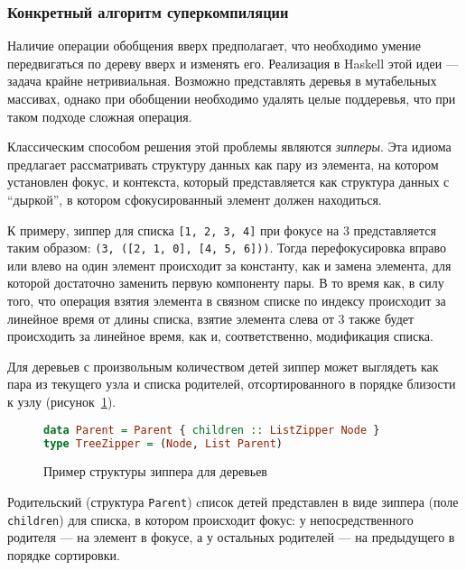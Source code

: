 \subsubsection{Конкретный алгоритм суперкомпиляции}

Наличие операции обобщения вверх предполагает, что необходимо умение передвигаться по дереву вверх и изменять его. 
Реализация в Haskell этой идеи --- задача крайне нетривиальная. Возможно представлять
деревья в мутабельных массивах, однако при обобщении необходимо удалять целые поддеревья,
что при таком подходе сложная операция.

Классическим способом решения этой проблемы являются \emph{зипперы}\cite{zipper}.
Эта идиома предлагает рассматривать структуру данных как пару из элемента,
на котором установлен фокус, и контекста, который представляется как структура данных
с ``дыркой'', в котором сфокусированный элемент должен находиться.

К примеру, зиппер для списка \lstinline{[1, 2, 3, 4]} при фокусе на 3 представляется
таким образом: \lstinline{(3, ([2, 1, 0], [4, 5, 6]))}.
Тогда перефокусировка вправо или влево на один элемент происходит за константу,
как и замена элемента, для которой достаточно заменить первую компоненту пары.
В то время как, в силу того, что операция взятия элемента в связном списке по индексу
происходит за линейное время от длины списка, взятие элемента слева от 3 также
будет происходить за линейное время, как и, соответственно, модификация списка.

Для деревьев с произвольным количеством детей зиппер может выглядеть
как пара из текущего узла и списка родителей, отсортированного в порядке
близости к узлу (рисунок~\ref{fig:zipper}). 
\begin{figure}[h!]
\begin{lstlisting}[mathescape,language=Haskell,extendedchars=\true,frame=single,basicstyle=\ttfamily]
data Parent = Parent { children :: ListZipper Node }
type TreeZipper = (Node, List Parent)
\end{lstlisting}
\caption{Пример структуры зиппера для деревьев}
\label{fig:zipper}
\end{figure}

Родительский (структура \lstinline{Parent}) cписок детей представлен в виде зиппера (поле \lstinline{children})
для списка, в котором происходит фокус: у непосредственного родителя --- на элемент в фокусе, а у остальных
родителей --- на предыдущего в порядке сортировки.

